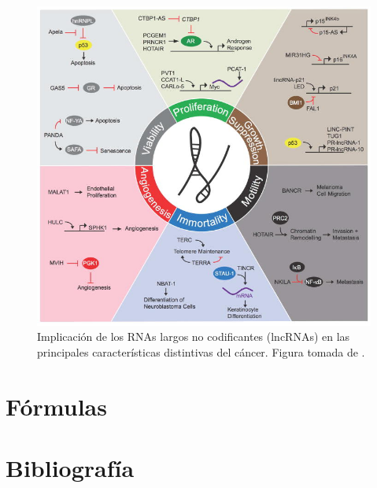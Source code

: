 \documentclass[a4paper,11pt]{article}
\begin{document}
\begin{figure}[h!]
\includegraphics{figuras/hallmarks.jpg}
\caption{Implicación de los RNAs largos no codificantes (lncRNAs) en las principales características distintivas del cáncer. Figura tomada de \cite{Schmitt2016}.}
\label{fig:hallmarks}
\end{figure}


\section{Fórmulas}



\section{Bibliografía}



\end{document}
